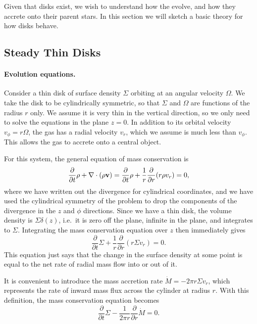 Given that disks exist, we wish to understand how the evolve, and how they accrete onto their parent stars. In this section we will sketch a basic theory for how disks behave.

\subsection{Steady Thin Disks}

\paragraph{Evolution equations.}

Consider a thin disk of surface density $\Sigma$ orbiting at an angular velocity $\Omega$. We take the disk to be cylindrically symmetric, so that $\Sigma$ and $\Omega$ are functions of the radius $r$ only. We assume it is very thin in the vertical direction, so we only need to solve the equations in the plane $z=0$. In addition to its orbital velocity $v_{\phi}=r\Omega$, the gas has a radial velocity $v_r$, which we assume is much less than $v_{\phi}$. This allows the gas to accrete onto a central object.

For this system, the general equation of mass conservation is
\begin{equation}
\frac{\partial}{\partial t}\rho + \nabla\cdot(\rho \mathbf{v}) = \frac{\partial}{\partial t}\rho + \frac{1}{r} \frac{\partial}{\partial r}(r \rho v_r) = 0,
\end{equation}
where we have written out the divergence for cylindrical coordinates, and we have used the cylindrical symmetry of the problem to drop the components of the divergence in the $z$ and $\phi$ directions. Since we have a thin disk, the volume density is $\Sigma \delta(z)$, i.e.\ it is zero off the plane, infinite in the plane, and integrates to $\Sigma$. Integrating the mass conservation equation over $z$ then immediately gives
\begin{equation}
\frac{\partial}{\partial t}\Sigma + \frac{1}{r} \frac{\partial}{\partial r}(r \Sigma v_r) = 0.
\end{equation}
This equation just says that the change in the surface density at some point is equal to the net rate of radial mass flow into or out of it.

It is convenient to introduce the mass accretion rate $\dot{M}=-2\pi r \Sigma v_r$, which represents the rate of inward mass flux across the cylinder at radius $r$. With this definition, the mass conservation equation becomes
\begin{equation}
\frac{\partial}{\partial t}\Sigma - \frac{1}{2\pi r} \frac{\partial}{\partial r}\dot{M} = 0.
\end{equation}


